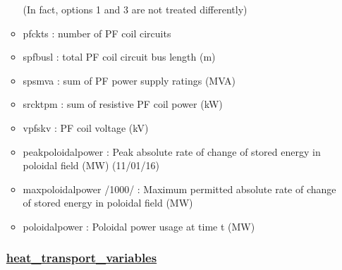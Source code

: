 \documentclass[]{article}
\begin{document}
\begin{itemize}
\begin{itemize}
    (In fact, options 1 and 3 are not treated differently)
  \item
    pfckts : number of PF coil circuits
  \item
    spfbusl : total PF coil circuit bus length (m)
  \item
    spsmva : sum of PF power supply ratings (MVA)
  \item
    srcktpm : sum of resistive PF coil power (kW)
  \item
    vpfskv : PF coil voltage (kV)
  \item
    peakpoloidalpower : Peak absolute rate of change of stored energy in
    poloidal field (MW) (11/01/16)
  \item
    maxpoloidalpower /1000/ : Maximum permitted absolute rate of change
    of stored energy in poloidal field (MW)
  \item
    poloidalpower : Poloidal power usage at time t (MW)
  \end{itemize}

  \subsubsection{\texorpdfstring{\href{heat_transport_variables.html}{heat\_transport\_variables}}{heat\_transport\_variables}}\label{heat_transport_variables}


\end{itemize}
\end{document}
